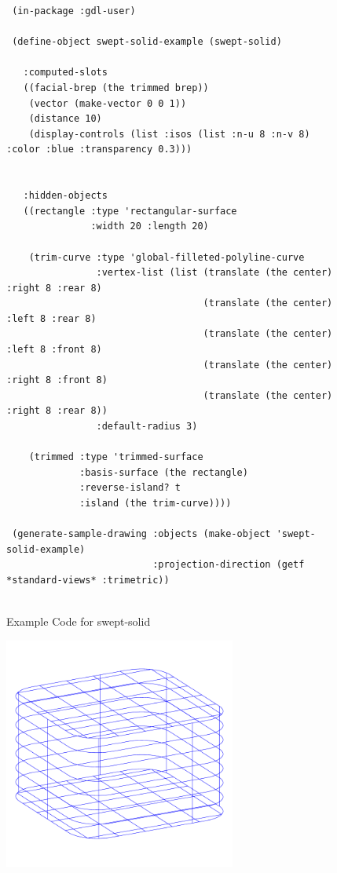 \documentclass [11pt]{book}
\begin{document}
\begin{itemize}
\begin{figure}
\begin{lrbox}{\boxedverb}
\begin{minipage}{\linewidth}
{\begin{verbatim}
 (in-package :gdl-user)

 (define-object swept-solid-example (swept-solid)

   :computed-slots
   ((facial-brep (the trimmed brep))
    (vector (make-vector 0 0 1))
    (distance 10)
    (display-controls (list :isos (list :n-u 8 :n-v 8) :color :blue :transparency 0.3)))

  
   :hidden-objects
   ((rectangle :type 'rectangular-surface
               :width 20 :length 20)

    (trim-curve :type 'global-filleted-polyline-curve
                :vertex-list (list (translate (the center) :right 8 :rear 8)
                                   (translate (the center) :left 8 :rear 8)
                                   (translate (the center) :left 8 :front 8)
                                   (translate (the center) :right 8 :front 8)
                                   (translate (the center) :right 8 :rear 8))
                :default-radius 3)

    (trimmed :type 'trimmed-surface
             :basis-surface (the rectangle)
             :reverse-island? t
             :island (the trim-curve))))

 (generate-sample-drawing :objects (make-object 'swept-solid-example)
                          :projection-direction (getf *standard-views* :trimetric))


\end{verbatim}}
\end{minipage}
\end{lrbox}
\fbox{\usebox{\boxedverb}}

\caption{Example Code for swept-solid}

\label{fig:example-code-swept-solid}

\end{figure}

\begin{figure}
\begin{center}
\includegraphics[width=3in,height=3in]{../images/example-swept-solid.pdf}
\end{center}


\end{figure}
\end{itemize}
\end{document}
